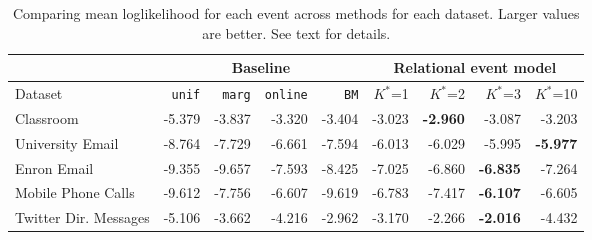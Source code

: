 \begin{table*}[t]
\begin{center}
{\footnotesize
\begin{tabular}{lrrrr|rrrr}
& \multicolumn{4}{c|}{Baseline} & \multicolumn{4}{c}{Relational event model}\\
  \hline
Dataset & \texttt{unif} & \texttt{marg} & \texttt{online} & \texttt{BM} & $K^*$=1 & $K^*$=2 & $K^*$=3 & $K^*$=10 \\ 
  \hline
  Classroom & -5.379 & -3.837 & -3.320 & -3.404 & -3.023 & \textbf{-2.960} & -3.087 & -3.203 \\ 
  University Email & -8.764 & -7.729 & -6.661 & -7.594 & -6.013 & -6.029 & -5.995 & \textbf{-5.977} \\ 
  Enron Email & -9.355 & -9.657 & -7.593 & -8.425 & -7.025 & -6.860 & \textbf{-6.835} & -7.264 \\ 
  Mobile Phone Calls & -9.612 & -7.756 & -6.607 & -9.619 & -6.783 & -7.417 & \textbf{-6.107} & -6.605 \\ 
  Twitter Dir. Messages & -5.106 & -3.662 & -4.216 & -2.962 & -3.170 & -2.266 & \textbf{-2.016} & -4.432 \\ 
   \hline
\end{tabular}
}
\caption{Comparing mean loglikelihood for each event across methods for each dataset.  Larger values are better.  See text for details.}
\label{tab:results}
\end{center}
\end{table*}
